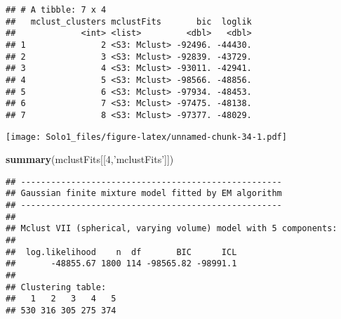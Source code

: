 \documentclass[]{article}
\newenvironment{Shaded}{\begin{snugshade}}{\end{snugshade}}
\newcommand{\KeywordTok}[1]{\textcolor[rgb]{0.13,0.29,0.53}{\textbf{#1}}}
\newcommand{\DataTypeTok}[1]{\textcolor[rgb]{0.13,0.29,0.53}{#1}}
\newcommand{\DecValTok}[1]{\textcolor[rgb]{0.00,0.00,0.81}{#1}}
\newcommand{\StringTok}[1]{\textcolor[rgb]{0.31,0.60,0.02}{#1}}
\newcommand{\OtherTok}[1]{\textcolor[rgb]{0.56,0.35,0.01}{#1}}
\newcommand{\OperatorTok}[1]{\textcolor[rgb]{0.81,0.36,0.00}{\textbf{#1}}}
\newcommand{\NormalTok}[1]{#1}
\begin{document}
\begin{verbatim}
## # A tibble: 7 x 4
##   mclust_clusters mclustFits       bic  loglik
##             <int> <list>         <dbl>   <dbl>
## 1               2 <S3: Mclust> -92496. -44430.
## 2               3 <S3: Mclust> -92839. -43729.
## 3               4 <S3: Mclust> -93011. -42941.
## 4               5 <S3: Mclust> -98566. -48856.
## 5               6 <S3: Mclust> -97934. -48453.
## 6               7 <S3: Mclust> -97475. -48138.
## 7               8 <S3: Mclust> -97377. -48029.
\end{verbatim}

\begin{Shaded}
\end{Shaded}

\texttt{[image: Solo1\_files/figure-latex/unnamed-chunk-34-1.pdf]}

\begin{Shaded}
\begin{Highlighting}[]
\KeywordTok{summary}\NormalTok{(mclustFits[[}\DecValTok{4}\NormalTok{,}\StringTok{'mclustFits'}\NormalTok{]])}
\end{Highlighting}
\end{Shaded}

\begin{verbatim}
## ---------------------------------------------------- 
## Gaussian finite mixture model fitted by EM algorithm 
## ---------------------------------------------------- 
## 
## Mclust VII (spherical, varying volume) model with 5 components: 
## 
##  log.likelihood    n  df       BIC      ICL
##       -48855.67 1800 114 -98565.82 -98991.1
## 
## Clustering table:
##   1   2   3   4   5 
## 530 316 305 275 374
\end{verbatim}

\begin{Shaded}
\end{Shaded}
\end{document}
